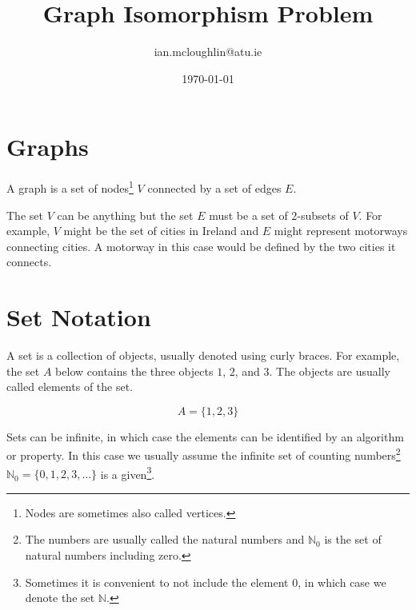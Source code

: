 \documentclass{notes}
\title{Graph Isomorphism Problem}
\author{ian.mcloughlin@atu.ie}
\date{\today}
\begin{document}
\maketitle


\section{Graphs}
  
  A graph\autocite[10]{sipser} is a set of nodes\footnote{Nodes are sometimes also called vertices.} $V$ connected by a set of edges $E$.

  \begin{figure}
    \center
    \end{figure}

  The set $V$ can be anything but the set $E$ must be a set of $2$-subsets of $V$.
  For example, $V$ might be the set of cities in Ireland and $E$ might represent motorways connecting cities.
  A motorway in this case would be defined by the two cities it connects.

\section{Set Notation}
  A set is a collection of objects, usually denoted using curly braces\autocite[3]{sipser}.
  For example, the set $A$ below contains the three objects $1$, $2$, and $3$.
  The objects are usually called elements of the set.

  $$ A = \{ 1, 2, 3 \} $$

  Sets can be infinite, in which case the elements can be identified by an algorithm or property.
  In this case we usually assume the infinite set of counting numbers\footnote{The numbers are usually called the natural numbers and $\mathbb{N}_0$ is the set of natural numbers including zero.} $\mathbb{N}_0 = \{ 0, 1, 2, 3, \ldots \}$ is a given\footnote{Sometimes it is convenient to not include the element $0$, in which case we denote the set $\mathbb{N}$.}.
\end{document}
